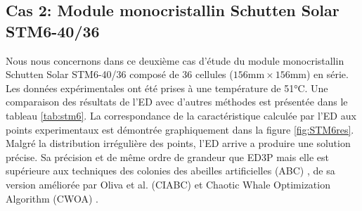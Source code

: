 
\subsection{Cas 2: Module monocristallin Schutten Solar STM6-40/36}

Nous nous concernons dans ce deuxième cas d'étude du module monocristallin Schutten Solar STM6-40/36 composé de 36 cellules ($156\si{\milli\meter}\times 156\si{\milli\meter}$) en série. Les données expérimentales ont été prises à une température de 51\si{\celsius}. Une comparaison des résultats de l'ED avec d'autres méthodes est présentée dans le tableau \ref{tab:stm6}. La correspondance de la caractéristique calculée par l'ED aux points experimentaux est démontrée graphiquement dans la figure \ref{fig:STM6res}. Malgré la distribution irrégulière des points, l'ED arrive a produire une solution précise. Sa précision et de même ordre de grandeur que ED3P \cite{Chin2019} mais elle est supérieure aux techniques des colonies des abeilles artificielles (ABC) \cite{Oliva2014}, de sa version améliorée par Oliva et al. (CIABC) \cite{Oliva2017a} et Chaotic Whale Optimization Algorithm (CWOA) \cite{Oliva2017}.
